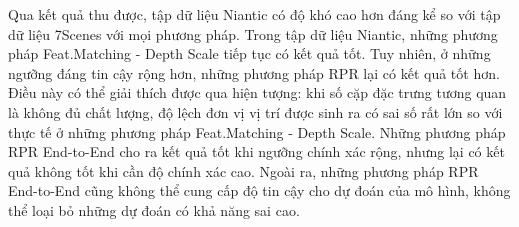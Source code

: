Qua kết quả thu được, tập dữ liệu Niantic có độ khó cao hơn đáng kể so với tập dữ liệu 7Scenes với mọi phương pháp. Trong tập dữ liệu Niantic, những phương pháp Feat.Matching - Depth Scale tiếp tục có kết quả tốt. Tuy nhiên, ở những ngưỡng đáng tin cậy rộng hơn, những phương pháp RPR lại có kết quả tốt hơn. Điều này có thể giải thích được qua hiện tượng: khi số cặp đặc trưng tương quan là không đủ chất lượng, độ lệch đơn vị vị trí được sinh ra có sai số rất lớn so với thực tế ở những phương pháp Feat.Matching - Depth Scale. Những phương pháp RPR End-to-End cho ra kết quả tốt khi ngưỡng chính xác rộng, nhưng lại có kết quả không tốt khi cần độ chính xác cao. Ngoài ra, những phương pháp RPR End-to-End cũng không thể cung cấp độ tin cậy cho dự đoán của mô hình, không thể loại bỏ những dự đoán có khả năng sai cao.
